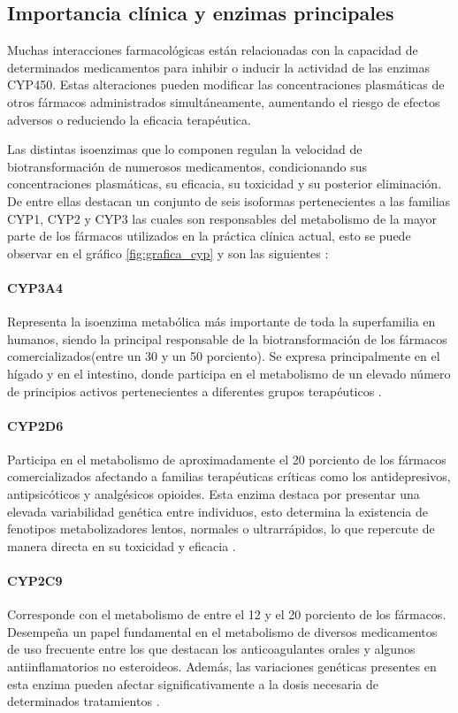 \subsection{Importancia clínica y enzimas principales}
Muchas interacciones farmacológicas están relacionadas con la capacidad de determinados medicamentos para inhibir o 
inducir la actividad de las enzimas CYP450. Estas alteraciones pueden modificar las concentraciones plasmáticas de 
otros fármacos administrados simultáneamente, aumentando el riesgo de efectos adversos o reduciendo la eficacia 
terapéutica.

Las distintas isoenzimas que lo componen regulan la velocidad de biotransformación de numerosos medicamentos, 
condicionando sus concentraciones plasmáticas, su eficacia, su toxicidad y su posterior eliminación. De entre ellas 
destacan un conjunto de seis isoformas pertenecientes a las familias CYP1, CYP2 y CYP3 las cuales son responsables del 
metabolismo de la mayor parte de los fármacos utilizados en la práctica clínica actual, esto se puede observar en 
el gráfico \ref{fig:grafica_cyp} y son las siguientes \cite{zanger2013cytochrome}:

\paragraph{CYP3A4}
Representa la isoenzima metabólica más importante de toda la superfamilia en humanos, siendo la principal responsable de la biotransformación de los fármacos comercializados(entre un 30 y un 50 porciento). Se expresa principalmente en el hígado y en el intestino, donde participa en el metabolismo de un elevado número de principios activos pertenecientes a diferentes grupos terapéuticos \cite{zanger2013cytochrome}.

\paragraph{CYP2D6}
Participa en el metabolismo de aproximadamente el 20 porciento de los fármacos comercializados afectando a familias terapéuticas críticas como los antidepresivos, antipsicóticos y analgésicos opioides. Esta enzima destaca por presentar una elevada variabilidad genética entre individuos, esto determina la existencia de fenotipos metabolizadores lentos, normales o ultrarrápidos, lo que repercute de manera directa en su toxicidad y eficacia \cite{ingelman2005genetic}. 

\paragraph{CYP2C9}
Corresponde con el metabolismo de entre el 12 y el 20 porciento de los fármacos. Desempeña un papel fundamental en el metabolismo de diversos medicamentos de uso frecuente entre los que destacan los anticoagulantes orales y algunos antiinflamatorios no esteroideos. Además, las variaciones genéticas presentes en esta enzima pueden afectar significativamente a la dosis necesaria de determinados tratamientos \cite{caudle2014clinical}.

